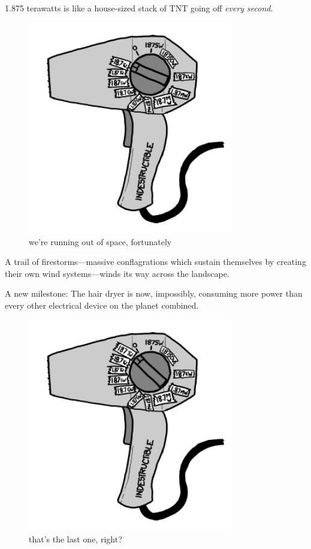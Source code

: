 {1.875 terawatts is like a house-sized stack of TNT going off \emph{every second}.}

\begin{figure}[!htbp]
\centering
\includegraphics[scale=0.5, max width=0.8\textwidth]{imgs/a/35/hair_dryer_1e13.png}
\caption{we're running out of space, fortunately}
\end{figure}

{A trail of firestorms—massive conflagrations which sustain themselves by creating their own wind systems—winds its way across the landscape.}

{A new milestone: The hair dryer is now, impossibly, consuming more power than every other electrical device on the planet combined.}

\begin{figure}[!htbp]
\centering
\includegraphics[scale=0.5, max width=0.8\textwidth]{imgs/a/35/hair_dryer_1e14.png}
\caption{that's the last one, right?}
\end{figure}

